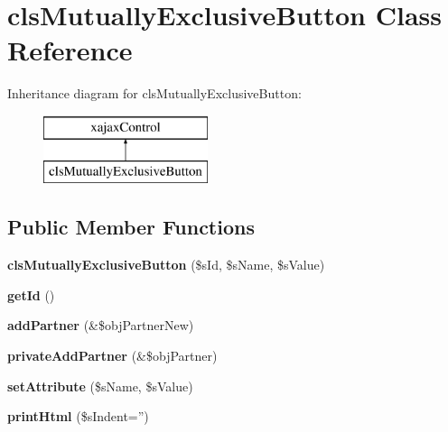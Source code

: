 \hypertarget{classclsMutuallyExclusiveButton}{
\section{clsMutuallyExclusiveButton Class Reference}
\label{classclsMutuallyExclusiveButton}
}
Inheritance diagram for clsMutuallyExclusiveButton:\begin{figure}[H]
\begin{center}
\leavevmode
\includegraphics[height=2.000000cm]{classclsMutuallyExclusiveButton}
\end{center}
\end{figure}
\subsection*{Public Member Functions}
\begin{DoxyCompactItemize}
\item 
\hypertarget{classclsMutuallyExclusiveButton_a32679ecd8e5c7facae19c15f439ddf26}{
{\bfseries clsMutuallyExclusiveButton} (\$sId, \$sName, \$sValue)}
\label{classclsMutuallyExclusiveButton_a32679ecd8e5c7facae19c15f439ddf26}

\item 
\hypertarget{classclsMutuallyExclusiveButton_a0422dd0659b5bbb8cd4fc33c552a61e0}{
{\bfseries getId} ()}
\label{classclsMutuallyExclusiveButton_a0422dd0659b5bbb8cd4fc33c552a61e0}

\item 
\hypertarget{classclsMutuallyExclusiveButton_ad2ef33f1f1950052dcdacc776f0bb1d1}{
{\bfseries addPartner} (\&\$objPartnerNew)}
\label{classclsMutuallyExclusiveButton_ad2ef33f1f1950052dcdacc776f0bb1d1}

\item 
\hypertarget{classclsMutuallyExclusiveButton_a556e48f4b35ffa7f37158119f140e7ca}{
{\bfseries privateAddPartner} (\&\$objPartner)}
\label{classclsMutuallyExclusiveButton_a556e48f4b35ffa7f37158119f140e7ca}

\item 
\hypertarget{classclsMutuallyExclusiveButton_a28bfc24c148dd03f5be2a518830b277a}{
{\bfseries setAttribute} (\$sName, \$sValue)}
\label{classclsMutuallyExclusiveButton_a28bfc24c148dd03f5be2a518830b277a}

\item 
\hypertarget{classclsMutuallyExclusiveButton_ad5e4618a8df73baef6574de1d3bd0d75}{
{\bfseries printHtml} (\$sIndent='')}
\label{classclsMutuallyExclusiveButton_ad5e4618a8df73baef6574de1d3bd0d75}

\end{DoxyCompactItemize}
